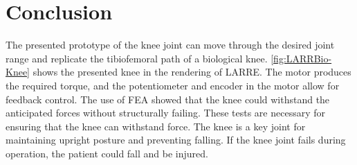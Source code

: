 \section{Conclusion}

The presented prototype of the knee joint can move through the desired joint range and replicate the tibiofemoral path of a biological knee. \autoref{fig:LARRBio-Knee} shows the presented knee in the rendering of LARRE. The motor produces the required torque, and the potentiometer and encoder in the motor allow for feedback control. The use of FEA showed that the knee could withstand the anticipated forces without structurally failing. These tests are necessary for ensuring that the knee can withstand force. The knee is a key joint for maintaining upright posture and preventing falling. If the knee joint fails during operation, the patient could fall and be injured. 

